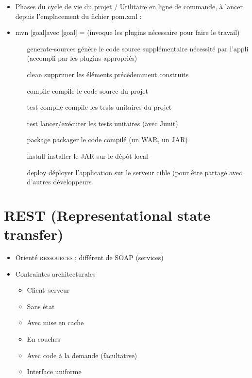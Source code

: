 \documentclass[11pt,twoside,a4paper]{article}
\begin{document}
\begin{landscape}
\begin{multicols}{2}
\begin{itemize}
\begin{itemize}
\begin{itemize}
			\end{itemize}
		\end{itemize}
		\item[] 
		\item Phases du cycle de vie du projet / Utilitaire en ligne de commande, {\`a} lancer depuis l'emplacement du fichier pom.xml : 
		\item mvn [goal]avec [goal] = (invoque les plugins n{\'e}cessaire pour faire le travail)
		\begin{itemize}
			\item[generate-sources] g{\'e}n{\`e}re le code source suppl{\'e}mentaire n{\'e}cessit{\'e} par l'appli (accompli par les plugins appropri{\'e}s)
			\item[clean] supprimer les {\'e}l{\'e}ments pr{\'e}c{\'e}demment construits
			\item[compile] compile le code source du projet
			\item[test-compile] compile les tests unitaires du projet
			\item[test] lancer/ex{\'e}cuter les tests unitaires (avec Junit)
			\item[package] packager le code compil{\'e} (un WAR, un JAR)
			\item[install] installer le JAR sur le d{\'e}p{\^o}t local
			\item[deploy] d{\'e}ployer l'application sur le serveur cible (pour {\^e}tre partag{\'e} avec d'autres d{\'e}veloppeurs
		\end{itemize}
	\end{itemize}
	
	\vfill
	
	\columnbreak

	\section*{REST (Representational state transfer)}
	\begin{itemize}
		\item Orient{\'e} \textsc{ressources} ; différent de SOAP (services)
		\item Contraintes architecturales
		\begin{itemize}
			\item Client–serveur
			\item Sans {\'e}tat
			\item Avec mise en cache
			\item En couches
			\item Avec code {\`a} la demande (facultative)
			\item Interface uniforme
		\end{itemize}
		

\end{itemize}
\end{multicols}
\end{landscape}
\end{document}
